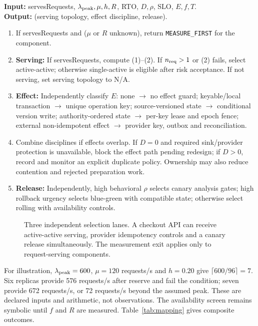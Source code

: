 \documentclass[conference,10pt]{IEEEtran}
\begin{document}
\begin{algorithm}[t]
\caption{Deployment Pattern Selection}
\footnotesize
\textbf{Input:} servesRequests, $\lambda_{\rm peak},\mu,h,R$, RTO, $D,\rho$, SLO, $E,f,T$.\\
\textbf{Output:} (serving topology, effect discipline, release).
\begin{enumerate}\setlength\itemsep{0pt}\setlength\parskip{0pt}
\item If servesRequests and ($\mu$ or $R$ unknown), return \texttt{MEASURE\_FIRST} for the component.
\item \textbf{Serving:} If servesRequests, compute (1)--(2). If $n_{\rm req}>1$ or (2) fails, select active-active; otherwise single-active is eligible after risk acceptance. If not serving, set serving topology to N/A.
\item \textbf{Effect:} Independently classify $E$: none $\to$ no effect guard; keyable/local transaction $\to$ unique operation key; source-versioned state $\to$ conditional version write; authority-ordered state $\to$ per-key lease and epoch fence; external non-idempotent effect $\to$ provider key, outbox and reconciliation.
\item Combine disciplines if effects overlap. If $D=0$ and required sink/provider protection is unavailable, block the effect path pending redesign; if $D>0$, record and monitor an explicit duplicate policy. Ownership may also reduce contention and rejected preparation work.
\item \textbf{Release:} Independently, high behavioral $\rho$ selects canary analysis gates; high rollback urgency selects blue-green with compatible state; otherwise select rolling with availability controls.
\end{enumerate}
\end{algorithm}

\begin{figure}[t]\centering

\caption{Three independent selection lanes. A checkout API can receive active-active serving, provider idempotency controls and a canary release simultaneously. The measurement exit applies only to request-serving components.}\label{fig:selection}
\end{figure}

For illustration, $\lambda_{\rm peak}=600$, $\mu=120$ requests/s and $h=0.20$ give $\lceil600/96\rceil=7$. Six replicas provide 576 requests/s after reserve and fail the condition; seven provide 672 requests/s, or 72 requests/s beyond the assumed peak. These are declared inputs and arithmetic, not observations. The availability screen remains symbolic until $f$ and $R$ are measured. Table~\ref{tab:mapping} gives composite outcomes.
\end{document}
